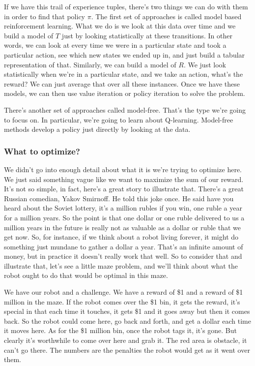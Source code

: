 \documentclass[12pt]{article}
\begin{document}
If we have this trail of experience tuples, there's two things we can do with them in order to find that policy $\pi$. The first set of approaches is called model based reinforcement learning. What we do is we look at this data over time and we build a model of $T$ just by looking statistically at these transitions. In other words, we can look at every time we were in a particular state and took a particular action, see which new states we ended up in, and just build a tabular representation of that. Similarly, we can build a model of $R$. We just look statistically when we're in a particular state, and we take an action, what's the reward? We can just average that over all these instances. Once we have these models, we can then use value iteration or policy iteration to solve the problem. 

There's another set of approaches called model-free. That's the type we're going to focus on. In particular, we're going to learn about Q-learning. Model-free methods develop a policy just directly by looking at the data. 

\subsubsection{What to optimize?}

We didn't go into enough detail about what it is we're trying to optimize here. We just said something vague like we want to maximize the sum of our reward. It's not so simple, in fact, here's a great story to illustrate that. There's a great Russian comedian, Yakov Smirnoff. He told this joke once. He said have you heard about the Soviet lottery, it's a million rubles if you win, one ruble a year for a million years. So the point is that one dollar or one ruble delivered to us a million years in the future is really not as valuable as a dollar or ruble that we get now. So, for instance, if we think about a robot living forever, it might do something just mundane to gather a dollar a year. That's an infinite amount of money, but in practice it doesn't really work that well. So to consider that and illustrate that, let's see a little maze problem, and we'll think about what the robot ought to do that would be optimal in this maze. 

We have our robot and a challenge. We have a reward of \$1 and a reward of \$1 million in the maze. If the robot comes over the \$1 bin, it gets the reward, it's special in that each time it touches, it gets \$1 and it goes away but then it comes back. So the robot could come here, go back and forth, and get a dollar each time it moves here. As for the \$1 million bin, once the robot tags it, it's gone. But clearly it's worthwhile to come over here and grab it. The red area is obstacle, it can't go there. The numbers are the penalties the robot would get as it went over them.
\end{document}
